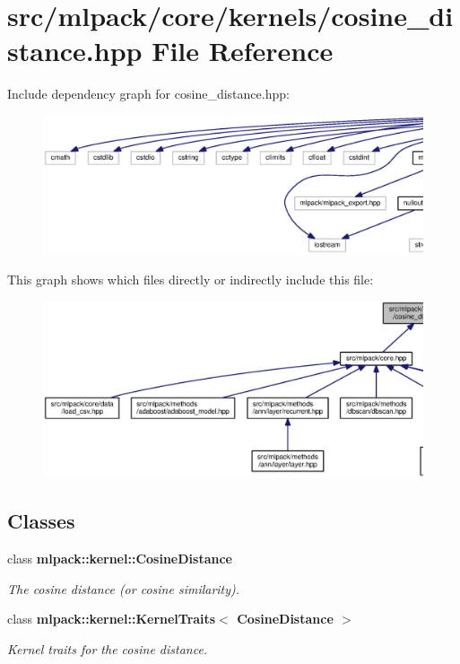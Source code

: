 \section{src/mlpack/core/kernels/cosine\+\_\+distance.hpp File Reference}
\label{cosine__distance_8hpp}
Include dependency graph for cosine\+\_\+distance.\+hpp\+:
\nopagebreak
\begin{figure}[H]
\begin{center}
\leavevmode
\includegraphics[width=350pt]{cosine__distance_8hpp__incl}
\end{center}
\end{figure}
This graph shows which files directly or indirectly include this file\+:
\nopagebreak
\begin{figure}[H]
\begin{center}
\leavevmode
\includegraphics[width=350pt]{cosine__distance_8hpp__dep__incl}
\end{center}
\end{figure}
\subsection*{Classes}
\begin{DoxyCompactItemize}
\item 
class {\bf mlpack\+::kernel\+::\+Cosine\+Distance}
\begin{DoxyCompactList}\small\item\em The cosine distance (or cosine similarity). \end{DoxyCompactList}\item 
class {\bf mlpack\+::kernel\+::\+Kernel\+Traits$<$ Cosine\+Distance $>$}
\begin{DoxyCompactList}\small\item\em Kernel traits for the cosine distance. \end{DoxyCompactList}\end{DoxyCompactItemize}
